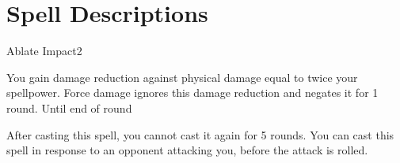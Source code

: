 \section{Spell Descriptions}

\small


\begin{spellsection}{Ablate Impact}{2}
    \begin{spellheader}
    \end{spellheader}
    \begin{spellcontent}
        \begin{spelltargetinginfo}
        \end{spelltargetinginfo}
        \begin{spelleffects}
            \spelleffect You gain damage reduction against physical damage equal to twice your spellpower. Force damage ignores this damage reduction and negates it for 1 round.
            \spelldur Until end of round
        \end{spelleffects}
    \end{spellcontent}
    \begin{spellfooter}
        \spellnotes After casting this spell, you cannot cast it again for 5 rounds. You can cast this spell in response to an opponent attacking you, before the attack is rolled.
        \miscastexplode
    \end{spellfooter}
\end{spellsection}

